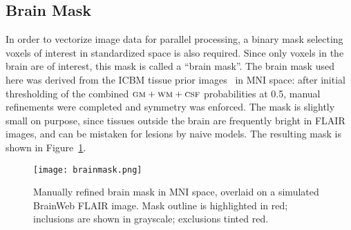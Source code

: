 \subsection{Brain Mask}\label{ss:brainmask}
In order to vectorize image data for parallel processing,
a binary mask selecting voxels of interest in standardized space is also required.
Since only voxels in the brain are of interest, this mask is called a ``brain mask''.
The brain mask used here was derived from
the ICBM tissue prior images~\cite{Mazziotta2001} in MNI space:
after initial thresholding of the combined $\textsc{gm}{}+\textsc{wm}{}+\textsc{csf}{}$ probabilities at 0.5,
manual refinements were completed and symmetry was enforced.
The mask is slightly small on purpose,
since tissues outside the brain are frequently bright in FLAIR images,
and can be mistaken for lesions by naive models.
The resulting mask is shown in Figure~\ref{fig:brainmask}.
\begin{figure}
  \centering
  \texttt{[image: brainmask.png]}
  \caption{Manually refined brain mask in MNI space, overlaid on a simulated BrainWeb FLAIR image.
    Mask outline is highlighted in red; inclusions are shown in grayscale; exclusions tinted red.}%
  \label{fig:brainmask}
\end{figure}
